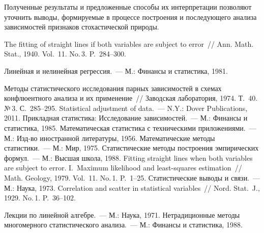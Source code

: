 \begin{multicols}{2}
  Полученные результаты и предложенные способы их интерпретации
позволяют уточнить выводы, формируемые в процессе построения и
по\-сле\-ду\-юще\-го анализа зависимостей признаков стохастической природы.

\vspace*{-6pt}

{\small\frenchspacing
{%
\begin{thebibliography}{99}

 The fitting of straight lines if both variables are subject to error~// Ann.
Math. Stat., 1940. Vol.~11. No.\,3. P.~284--300.

 Линейная и нелинейная регрессия.~--- М.: Финансы и
статистика, 1981.

 Методы статистического исследования
парных зависимостей в схемах конфлюентного анализа и их применение~//
Заводская лаборатория, 1974. Т.~40. №\,3. С.~285--295.
 Statistical adjustment of data.~--- N.Y.: Dover Publications, 2011.
 Прикладная статистика:
Исследование зависимостей.~--- М.: Финансы и статистика, 1985.
 Математическая статистика с техническими приложениями.~--- М.:
Изд-во иностранной литературы, 1956.
 Математические методы статистики.~--- М.: Мир, 1975.
 Статистические методы построения эмпирических
формул.~--- М.: Высшая школа, 1988.
 Fitting straight lines when both variables are subject to error.
I.~Maximum likelihood and least-squares estimation~// Math. Geology, 1979.
Vol.~11. No.\,1. P.~1--25.
 Статистические выводы и связи.~--- М.: Наука,
1973.
 Correlation and scatter in statistical variables~// Nord. Stat.~J., 1929.
No.\,1. P.~36--102.

\label{end\stat}

 Лекции по линейной алгебре.~--- М.: Наука, 1971.
 Нетрадиционные методы многомерного статистического
анализа.~--- М.: Финансы и статистика, 1988.
\end{thebibliography}

}
}


\end{multicols}